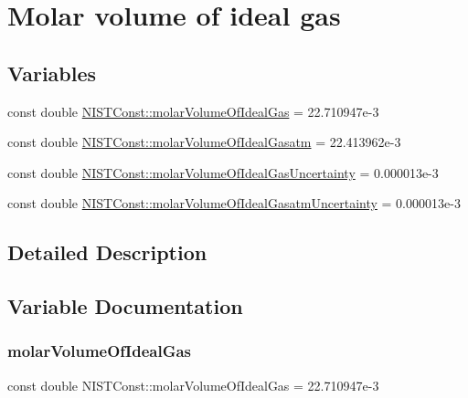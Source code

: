 \hypertarget{group___molar_volume}{}\section{Molar volume of ideal gas}
\label{group___molar_volume}
\subsection*{Variables}
\begin{DoxyCompactItemize}
\item 
const double \hyperlink{group___molar_volume_ga666dc78c2b916ed12bcaf3ec15d7c4d3}{N\+I\+S\+T\+Const\+::molar\+Volume\+Of\+Ideal\+Gas} = 22.\+710947e-\/3
\item 
const double \hyperlink{group___molar_volume_ga005e08baa33a25a474bd2287281883c4}{N\+I\+S\+T\+Const\+::molar\+Volume\+Of\+Ideal\+Gasatm} = 22.\+413962e-\/3
\item 
const double \hyperlink{group___molar_volume_ga61a743451588f97b027f4ac314ced50a}{N\+I\+S\+T\+Const\+::molar\+Volume\+Of\+Ideal\+Gas\+Uncertainty} = 0.\+000013e-\/3
\item 
const double \hyperlink{group___molar_volume_gaff48f0b13c5f974735f0826b7585a0c7}{N\+I\+S\+T\+Const\+::molar\+Volume\+Of\+Ideal\+Gasatm\+Uncertainty} = 0.\+000013e-\/3
\end{DoxyCompactItemize}


\subsection{Detailed Description}


\subsection{Variable Documentation}
\mbox{\label{group___molar_volume_ga666dc78c2b916ed12bcaf3ec15d7c4d3}} 
\subsubsection{\texorpdfstring{molar\+Volume\+Of\+Ideal\+Gas}{molarVolumeOfIdealGas}}
{\footnotesize\ttfamily const double N\+I\+S\+T\+Const\+::molar\+Volume\+Of\+Ideal\+Gas = 22.\+710947e-\/3}

